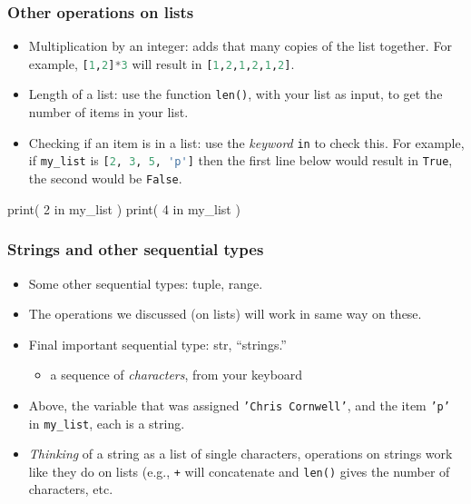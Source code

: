 \documentclass{beamer}
\newenvironment{codeblock}
    {\hfill\begin{beamerboxesrounded}[lower=codecol, width=0.8\textwidth]
    \medskip

    }
    { 
    \end{beamerboxesrounded}\hfill
    }
\theoremstyle{example}
\newcommand{\ct}[1]{\lstinline[language=Python]!#1!}
\newcommand{\ttt}[1]{\texttt{#1}}
\begin{document}
\begin{frame}[fragile]
\frametitle{Other operations on lists}

\begin{itemize}
	\item Multiplication by an integer: adds that many copies of the list together. For example, \ct{[1,2]*3} will result in \ct{[1,2,1,2,1,2]}.
	\pause
	\item Length of a list: use the function \ttt{len()}, with your list as input, to get the number of items in your list.
	\pause
	\item Checking if an item is in a list: use the \emph{keyword} \ttt{in} to check this. For example, if \ttt{my}\ct{_}\ttt{list} is \ct{[2, 3, 5, 'p']} then the first line below would result in \ttt{True}, the second would be \ttt{False}.
\end{itemize}

\begin{codeblock}

\begin{python}
print( 2 in my_list )
print( 4 in my_list )
\end{python}

\end{codeblock}

\end{frame}

\begin{frame}
\frametitle{Strings and other sequential types}

\begin{itemize}
	\item Some other sequential types: {\ttb tuple}, {\ttb range}.
	\item The operations we discussed (on lists) will work in same way on these.

	\pause
	\item Final important sequential type: {\ttb str}, ``strings.''
	\begin{itemize}
		\item a sequence of \emph{characters}, from your keyboard
	\end{itemize}
	\item Above, the variable that was assigned \ttt{'Chris Cornwell'}, and the item \ttt{'p'} in \ttt{my}\ct{_}\ttt{list}, each is a string.
	\pause
	\item \emph{Thinking} of a string as a list of single characters, operations on strings work like they do on lists (e.g., \ttt{+} will concatenate and \ttt{len()} gives the number of characters, etc. 
\end{itemize}
\end{frame}
\end{document}
